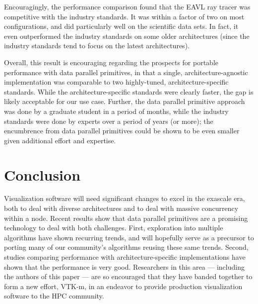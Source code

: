 \documentclass{superfri}
\begin{document}
Encouragingly, the performance comparison found that the EAVL 
ray tracer was competitive with the industry standards.
%
It was within a factor of two on most configurations, and did particularly
well on the scientific data sets.
%
In fact, it even outperformed the industry standards on some older
architectures (since the industry standards tend to focus on 
the latest architectures).
%

Overall, this result is encouraging regarding the prospects for portable
performance with data parallel primitives, in that 
a single, architecture-agnostic implementation was comparable to two 
highly-tuned, architecture-specific standards.
%
While the architecture-specific standards were clearly faster, the gap
is likely acceptable for our use case.
%
Further, the data parallel primitive approach was done by a graduate
student in a period of months, while the industry standards were done by
experts over a period of years (or more); the encumbrence from data parallel
primitives could be shown to be even smaller given additional effort and expertise.

\section{Conclusion}

Visualization software will need significant changes to excel in
the exascale era, both to deal with diverse architectures and to 
deal with massive concurrency within a node.
%
Recent results show that data parallel primitives are a promising technology
to deal with both challenges.
%
First, exploration into multiple algorithms have shown recurring
trends, and will hopefully serve as a precursor to porting many of our
community's algorithms reusing these same trends.
%
Second, studies comparing performance with architecture-specific
implementations have shown that the performance is very good.
%
Researchers in this area --- including the authors of this paper ---
are so encouraged that they have banded together to form a new effort, 
VTK-m, in an endeavor to provide production visualization software
to the HPC community.





\end{document}
